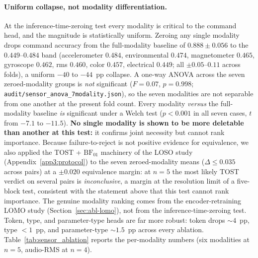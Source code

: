 \documentclass[sensors,article,submit,moreauthors,pdftex]{Definitions/mdpi}
\begin{document}
\paragraph{Uniform collapse, not modality differentiation.} At the inference-time-zeroing test every modality is critical to the command head, and the magnitude is statistically uniform. Zeroing any single modality drops command accuracy from the full-modality baseline of $0.888 \pm 0.056$ to the $0.449$--$0.484$ band (accelerometer $0.484$, environmental $0.474$, magnetometer $0.465$, gyroscope $0.462$, rms $0.460$, color $0.457$, electrical $0.449$; all $\pm 0.05$--$0.11$ across folds), a uniform $-40$ to $-44$~pp collapse. A one-way ANOVA across the seven zeroed-modality groups is \emph{not} significant ($F=0.07$, $p=0.998$; \texttt{audit/sensor\_anova\_7modality.json}), so the seven modalities are not separable from one another at the present fold count. Every modality \emph{versus} the full-modality baseline \emph{is} significant under a Welch test ($p<0.001$ in all seven cases, $t$ from $-7.1$ to $-11.5$). \textbf{No single modality is shown to be more deletable than another at this test:} it confirms joint necessity but cannot rank importance. Because failure-to-reject is not positive evidence for equivalence, we also applied the TOST + $\mathrm{BF}_{01}$ machinery of the LOSO study (Appendix~\ref{app3:protocol}) to the seven zeroed-modality means ($\Delta\!\le\!0.035$ across pairs) at a $\pm 0.020$ equivalence margin: at $n\!=\!5$ the most likely TOST verdict on several pairs is \emph{inconclusive}, a margin at the resolution limit of a five-block test, consistent with the statement above that this test cannot rank importance. The genuine modality ranking comes from the encoder-retraining LOMO study (Section~\ref{sec:abl-lomo}), not from the inference-time-zeroing test. Token, type, and parameter-type heads are far more robust: token drops $\sim 4$~pp, type $<1$~pp, and parameter-type $\sim 1.5$~pp across every ablation. Table~\ref{tab:sensor_ablation} reports the per-modality numbers (six modalities at $n\!=\!5$, audio-RMS at $n\!=\!4$).


\end{document}

